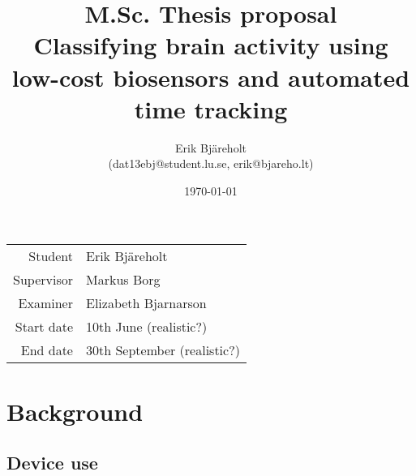 \documentclass{IEEEtran}
\title{%
    \large M.Sc. Thesis proposal \\
    \huge Classifying brain activity using low-cost biosensors and automated time tracking
}
\author{Erik Bjäreholt \\(dat13ebj@student.lu.se, erik@bjareho.lt)}
\date{\today}
\begin{document}
\maketitle

\begin{center}
\begin{tabular}{r l}
 Student & Erik Bjäreholt \\
 Supervisor & Markus Borg \\
 Examiner & Elizabeth Bjarnarson \\
 Start date & 10th June (realistic?) \\
 End date & 30th September (realistic?) \\
\end{tabular}
\end{center}

\tableofcontents

\begin{comment}
\section{Requirements for this document}

The process for CS students: http://cs.lth.se/examensarbete/hur-gaar-det-till/
General CS dep resource: http://cs.lth.se/examensarbete/
General LTH resource: http://www.student.lth.se/studieinformation/examensarbete/examensarbetsprocessen/

 - [ ] Arbetstitel, inblandades namn och kontaktuppgifter samt preliminärt start- och slutdatum.
 - [ ] Bakgrund/kontext och motiv för examensarbetet.
 - [ ] Övergripande mål och problemställningar/forskningsfrågor.
 - [ ] Angreppssätt/metodik och metoder.
 - [ ] Vetenskaplig grund och beprövad erfarenhet som examensarbetet ska bygga vidare på. Detta kan t ex beskrivas i form av ett par nyckelreferenser till artiklar eller annat underlag.
 - [ ] Hur förväntas examensarbetet bidra till kunskapsutvecklingen?
 - [ ] Preliminär beskrivning av resurser som krävs för arbetets genomförande, t ex arbetsplats och utrustning, och hur dessa ordnas och finns tillgängliga.

\end{comment}

\section{Background}

\subsection{Device use}
\end{document}
